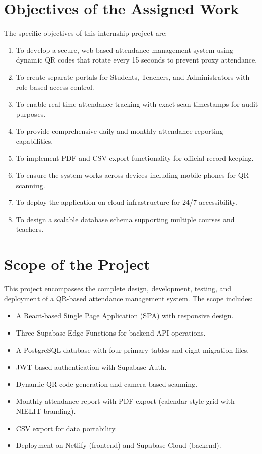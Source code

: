 \documentclass{SOICTthesis}
\begin{document}
\section{Objectives of the Assigned Work}
\label{sec:objectives}

The specific objectives of this internship project are:

\begin{enumerate}
    \item To develop a secure, web-based attendance management system using dynamic QR codes that rotate every 15 seconds to prevent proxy attendance.
    \item To create separate portals for Students, Teachers, and Administrators with role-based access control.
    \item To enable real-time attendance tracking with exact scan timestamps for audit purposes.
    \item To provide comprehensive daily and monthly attendance reporting capabilities.
    \item To implement PDF and CSV export functionality for official record-keeping.
    \item To ensure the system works across devices including mobile phones for QR scanning.
    \item To deploy the application on cloud infrastructure for 24/7 accessibility.
    \item To design a scalable database schema supporting multiple courses and teachers.
\end{enumerate}

\section{Scope of the Project}
\label{sec:scope}

This project encompasses the complete design, development, testing, and deployment of a QR-based attendance management system. The scope includes:

\begin{itemize}
    \item A React-based Single Page Application (SPA) with responsive design.
    \item Three Supabase Edge Functions for backend API operations.
    \item A PostgreSQL database with four primary tables and eight migration files.
    \item JWT-based authentication with Supabase Auth.
    \item Dynamic QR code generation and camera-based scanning.
    \item Monthly attendance report with PDF export (calendar-style grid with NIELIT branding).
    \item CSV export for data portability.
    \item Deployment on Netlify (frontend) and Supabase Cloud (backend).
\end{itemize}
\end{document}
